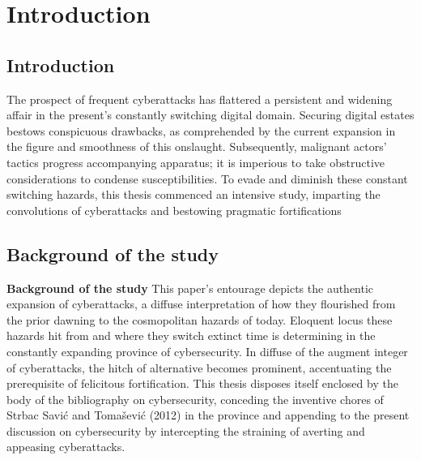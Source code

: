 \chapter{Introduction}
\label{ch:into} %


\section{Introduction}
\label{sec:into_back}

The prospect of frequent cyberattacks has flattered a persistent and widening affair in the 
present's constantly switching digital domain. Securing digital estates bestows conspicuous 
drawbacks, as comprehended by the current expansion in the figure and smoothness of this 
onslaught. Subsequently, malignant actors' tactics progress accompanying apparatus; it is 
imperious to take obstructive considerations to condense susceptibilities. To evade and 
diminish these constant switching hazards, this thesis commenced an intensive study, imparting 
the convolutions of cyberattacks and bestowing pragmatic fortifications


\section{Background of the study}
\label{sec:into_back}
\textbf{Background of the study}
This paper's entourage depicts the authentic expansion of cyberattacks, a diffuse 
interpretation of how they flourished from the prior dawning to the cosmopolitan hazards of 
today. Eloquent locus these hazards hit from and where they switch extinct time is determining 
in the constantly expanding province of cybersecurity. In diffuse of the augment integer of 
cyberattacks, the hitch of alternative becomes prominent, accentuating the prerequisite of 
felicitous fortification. This thesis disposes itself enclosed by the body of the bibliography 
on cybersecurity, conceding the inventive chores of Strbac Savić and Tomašević (2012) in the 
province and appending to the present discussion on cybersecurity by intercepting the straining 
of averting and appeasing cyberattacks.

